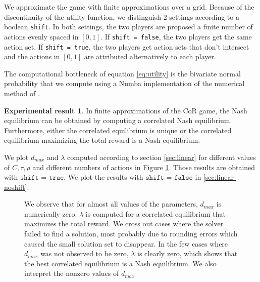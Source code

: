 \documentclass[preprint,12pt,authoryear,doubleblind]{elsarticle}
\theoremstyle{definition}
\newtheorem{result}[theorem]{Experimental result}
\begin{document}
We approximate the game with finite approximations over a grid. Because of the discontinuity of the utility function, we distinguish 2 settings according to a boolean \texttt{shift}. In both settings, the two players are proposed a finite number of actions evenly spaced in $[0, 1]$. If \texttt{shift = false}, the two players get the same action set. If \texttt{shift = true}, the two players get action sets that don't intersect and the actions in $[0, 1]$ are attributed alternatively to each player.

The computational bottleneck of equation \ref{eq:utility} is the bivariate normal probability that we compute using a Numba \citep{lam2015numba} implementation of the numerical method of \citet{genz2004numerical}.

\begin{result}
In finite approximations of the CoR game, the Nash equilibrium can be obtained by computing a correlated Nash equilibrium. Furthermore, either the correlated equilibrium is unique or the correlated equilibrium maximizing the total reward is a Nash equilibrium.
\end{result}

We plot $d_{max}$ and $\lambda$ computed according to section \ref{sec:linear} for different values of $C, \tau, \rho$ and different numbers of actions in Figure \ref{fig:linear-shift}. Those results are obtained with $\texttt{shift = true}$. We plot the results with $\texttt{shift = false}$ in \ref{sec:linear-noshift}.

\begin{figure}[htbp]
  \centering
  \begin{minipage}[t]{0.48\textwidth}
    \centering
    
  \end{minipage}
  \hfill
  \begin{minipage}[t]{0.48\textwidth}
    \centering
    
  \end{minipage}
  \caption{We observe that for almost all values of the parameters, $d_{max}$ is numerically zero. $\lambda$ is computed for a correlated equilibrium that maximizes the total reward. We cross out cases where the solver failed to find a solution, most probably due to rounding errors which caused the small solution set to disappear. In the few cases where $d_{max}$ was not observed to be zero, $\lambda$ is clearly zero, which shows that the best correlated equilibrium is a Nash equilibrium. We also interpret the nonzero values of $d_{max}$}
  \label{fig:linear-shift}  
\end{figure}
\end{document}
